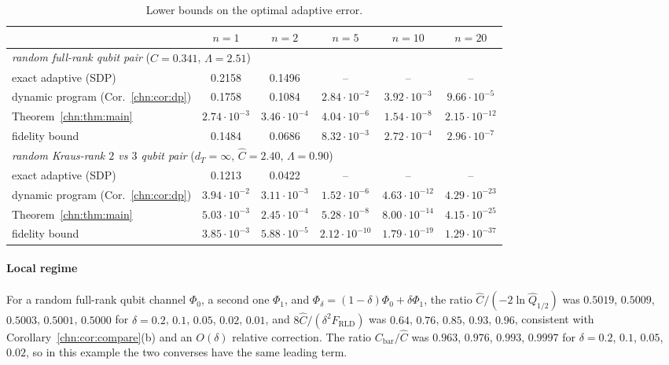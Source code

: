 \begin{table}[!tbp]
\centering
\small
\setlength{\tabcolsep}{4pt}
\begin{tabular}{lccccc}
\toprule
& $n=1$ & $n=2$ & $n=5$ & $n=10$ & $n=20$\\
\midrule
\multicolumn{6}{l}{\emph{random full-rank qubit pair} ($\widehat C=0.341$, $\Lambda=2.51$)}\\
exact adaptive (SDP) & 0.2158 & 0.1496 & -- & -- & --\\
dynamic program (Cor.~\ref{chn:cor:dp}) & 0.1758 & 0.1084 & $2.84\cdot10^{-2}$ & $3.92\cdot10^{-3}$ & $9.66\cdot10^{-5}$\\
Theorem~\ref{chn:thm:main} & $2.74\cdot10^{-3}$ & $3.46\cdot10^{-4}$ & $4.04\cdot10^{-6}$ & $1.54\cdot10^{-8}$ & $2.15\cdot10^{-12}$\\
fidelity bound & 0.1484 & 0.0686 & $8.32\cdot10^{-3}$ & $2.72\cdot10^{-4}$ & $2.96\cdot10^{-7}$\\
\midrule
\multicolumn{6}{l}{\emph{random Kraus-rank $2$ vs $3$ qubit pair} ($d_T=\infty$, $\widehat C=2.40$, $\Lambda=0.90$)}\\
exact adaptive (SDP) & 0.1213 & 0.0422 & -- & -- & --\\
dynamic program (Cor.~\ref{chn:cor:dp}) & $3.94\cdot10^{-2}$ & $3.11\cdot10^{-3}$ & $1.52\cdot10^{-6}$ & $4.63\cdot10^{-12}$ & $4.29\cdot10^{-23}$\\
Theorem~\ref{chn:thm:main} & $5.03\cdot10^{-3}$ & $2.45\cdot10^{-4}$ & $5.28\cdot10^{-8}$ & $8.00\cdot10^{-14}$ & $4.15\cdot10^{-25}$\\
fidelity bound & $3.85\cdot10^{-3}$ & $5.88\cdot10^{-5}$ & $2.12\cdot10^{-10}$ & $1.79\cdot10^{-19}$ & $1.29\cdot10^{-37}$\\
\bottomrule
\end{tabular}
\caption{Lower bounds on the optimal adaptive error.}
\label{chn:tab:dp}
\end{table}

\paragraph{Local regime} For a random full-rank qubit channel $\Phi_0$, a second one $\Phi_1$, and $\Phi_\delta=(1-\delta)\Phi_0+\delta\Phi_1$, the ratio $\widehat C/(-2\ln\widehat Q_{1/2})$ was $0.5019$, $0.5009$, $0.5003$, $0.5001$, $0.5000$ for $\delta=0.2$, $0.1$, $0.05$, $0.02$, $0.01$, and $8\widehat C/(\delta^2F_{\mathrm{RLD}})$ was $0.64$, $0.76$, $0.85$, $0.93$, $0.96$, consistent with Corollary~\ref{chn:cor:compare}(b) and an $O(\delta)$ relative correction. The ratio $C_{\mathrm{bar}}/\widehat C$ was $0.963$, $0.976$, $0.993$, $0.9997$ for $\delta=0.2$, $0.1$, $0.05$, $0.02$, so in this example the two converses have the same leading term.

